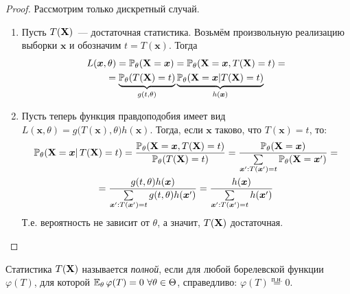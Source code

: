 \begin{proof}
    Рассмотрим только дискретный случай. 
    \begin{enumerate}
        \item[$\implies$] Пусть $T(\mathbf{X})$~--- достаточная статистика. 
            Возьмём произвольную реализацию выборки $\boldsymbol{x}$ и обозначим $t = T(\boldsymbol{x})$. Тогда
            \begin{multline*}
                L(\boldsymbol{x}, \theta) = \operatorname{\operatorname{\mathbb{P}}_{\theta}} (\mathbf{X}=\boldsymbol{x})=\operatorname{\operatorname{\mathbb{P}}_{\theta}} (\mathbf{X}=\boldsymbol{x}, T(\mathbf{X})=t) =\\
                = \underbrace{\operatorname{\operatorname{\mathbb{P}}_{\theta}} (T(\mathbf{X})=t)}_{g(t, \theta)} \underbrace{\operatorname{\operatorname{\mathbb{P}}_{\theta}} (\mathbf{X}=\boldsymbol{x} | T(\mathbf{X})=t)}_{h(\boldsymbol{x})}
            \end{multline*}
        \item[$\impliedby$] Пусть теперь функция правдоподобия имеет вид $L(\boldsymbol{x}, \theta)=g\bigl(T(\boldsymbol{x}), \theta\bigr) h(\boldsymbol{x})$. 
            Тогда, если $\boldsymbol{x}$ таково, что $T(\boldsymbol{x})=t$, то:
            \begin{multline*}
                \operatorname{\operatorname{\mathbb{P}}_{\theta}} (\mathbf{X}=\boldsymbol{x} | \, T(\mathbf{X})=t) =\frac{\operatorname{\operatorname{\mathbb{P}}_{\theta}} (\mathbf{X}=\boldsymbol{x}, T(\mathbf{X})=t)}{\operatorname{\operatorname{\mathbb{P}}_{\theta}} (T(\mathbf{X})=t)}
                =\frac{\operatorname{\operatorname{\mathbb{P}}_{\theta}} (\mathbf{X}=\boldsymbol{x})}{\sum\limits_{\boldsymbol{x}^{\prime}: T(\boldsymbol{x}^{\prime})=t} \operatorname{\operatorname{\mathbb{P}}_{\theta}}(\mathbf{X}=\boldsymbol{x}^{\prime})} = \\
                = \frac{g(t, \theta) h(\boldsymbol{x})}{\sum\limits_{\boldsymbol{x}^{\prime}: T(\boldsymbol{x}^{\prime})=t} g(t, \theta) h(\boldsymbol{x}^{\prime})}
                = \frac{h(\boldsymbol{x})}{\sum\limits_{\boldsymbol{x}^{\prime}: T(\boldsymbol{x}^{\prime})=t} h(\boldsymbol{x}^{\prime})}
            \end{multline*}
            Т.е. вероятность не зависит от $\theta$, а значит, $T(\mathbf{X})$ достаточная.
            \qedhere
    \end{enumerate}
\end{proof}

\begin{defn}
    Статистика $T(\mathbf{X})$ называется \textit{полной}, если для любой борелевской функции $\varphi(T)$, для которой $\operatorname{\operatorname{\mathbb{E}}_{\theta}} \varphi(T)=0~\forall \theta \in \Theta$, справедливо: $\varphi(T) \stackrel{\text{п.н.}}{=}0$.
\end{defn}

